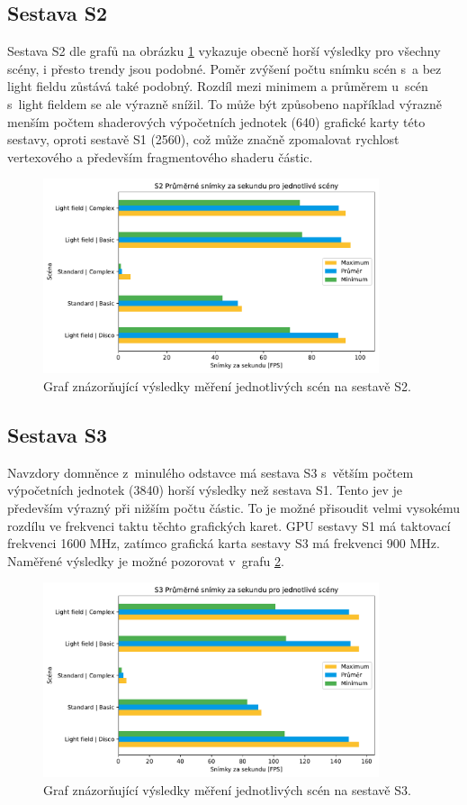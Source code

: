 \subsection*{Sestava S2}
Sestava S2 dle grafů na obrázku \ref{fig:graphS2Basic} vykazuje obecně horší výsledky pro všechny scény, i přesto trendy jsou podobné. Poměr zvýšení počtu snímku scén s~a bez light fieldu zůstává také podobný. Rozdíl mezi minimem a průměrem u~scén s~light fieldem se ale výrazně snížil. To může být způsobeno například výrazně menším počtem shaderových výpočetních jednotek (640) grafické karty této sestavy, oproti sestavě S1 (2560), což může značně zpomalovat rychlost vertexového a především fragmentového shaderu částic. 
\begin{figure}[H]
	\centering
		\includegraphics[width=0.88\textwidth]{obrazky-figures/graphS2basic.pdf}
	\caption{Graf znázorňující výsledky měření jednotlivých scén na sestavě S2.}
	\label{fig:graphS2Basic}
\end{figure}
\subsection*{Sestava S3}
Navzdory domněnce z~minulého  odstavce má sestava S3 s~větším počtem výpočetních jednotek (3840) horší výsledky než sestava S1. Tento jev je především výrazný při nižším počtu částic. To je možné přisoudit velmi vysokému rozdílu ve frekvenci taktu těchto grafických karet. GPU sestavy S1 má taktovací frekvenci 1600 MHz, zatímco grafická karta sestavy S3 má frekvenci 900 MHz. Naměřené výsledky je možné pozorovat v~grafu \ref{fig:graphS3Basic}.

\begin{figure}[H]
	\centering
		\includegraphics[width=0.88\textwidth]{obrazky-figures/graphS3basic.pdf}
	\caption{Graf znázorňující výsledky měření jednotlivých scén na sestavě S3.}
	\label{fig:graphS3Basic}
\end{figure}

